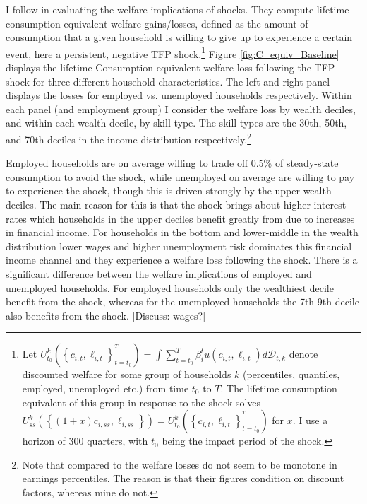 I follow \citet{gornemann2016doves} in evaluating the welfare implications of shocks. They compute lifetime consumption equivalent welfare gains/losses, defined as the amount of consumption that a given household is willing to give up to experience a certain event, here a persistent, negative TFP shock.\footnote{Let $U_{t_{0}}^{k}\left(\left\{ c_{i,t},\ell_{i,t}\right\} _{t=t_{0}}^{^{T}}\right)=\int\sum_{t=t_{0}}^{T}\beta_{i}^{t}u\left(c_{i,t},\ell_{i,t}\right)d\mathcal{D}_{t,k}$ denote discounted welfare for some group of households $k$ (percentiles, quantiles, employed, unemployed etc.) from time $t_0$ to $T$. The lifetime consumption equivalent of this group in response to the shock solves $U_{ss}^{k}\left(\left\{ \left(1+x\right)c_{i,ss},\ell_{i,ss}\right\} \right)=U_{t_{0}}^{k}\left(\left\{ c_{i,t},\ell_{i,t}\right\} _{t=t_{0}}^{^{T}}\right)$ for $x$. I use a horizon of 300 quarters, with $t_0$ being the impact period of the shock.  }
Figure \ref{fig:C_equiv_Baseline} displays the lifetime Consumption-equivalent welfare loss following the TFP shock for three different household characteristics. The left and right panel displays the losses for employed vs. unemployed households respectively. Within each panel (and employment group) I consider the welfare loss by wealth deciles, and within each wealth decile, by skill type. The skill types are the 30th, 50th, and 70th deciles in the income distribution respectively.\footnote{Note that compared to \citet{gornemann2016doves} the welfare losses do not seem to be monotone in earnings percentiles. The reason is that their figures condition on discount factors, whereas mine do not.} 

Employed households are on average willing to trade off 0.5\% of steady-state consumption to avoid the shock, while unemployed on average are willing to pay to experience the shock, though this is driven strongly by the upper wealth deciles. The main reason for this is that the shock brings about higher interest rates which households in the upper deciles benefit greatly from due to increases in financial income. For households in the bottom and lower-middle in the wealth distribution lower wages and higher unemployment risk dominates this financial income channel and they experience a welfare loss following the shock. 
There is a significant difference between the welfare implications of employed and unemployed households. For employed households only the wealthiest decile benefit from the shock, whereas for the unemployed households the 7th-9th decile also benefits from the shock. [Discuss: wages?]


